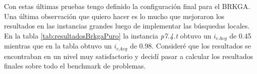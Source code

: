 \bigskip

Con estas últimas pruebas tengo definido la configuración final para el BRKGA. Una última observación que quiero hacer es lo mucho que mejoraron los resultados en las instancias grandes luego de implementar las búsquedas locales. En la tabla \ref{tab:resultadosBrkgaPuro} la instancia \textit{p7.4.t} obtuvo un $i_{eAvg}$ de 0.45 mientras que en la tabla \label{tab:resultadosLSDecos} obtuvo un $i_{eAvg}$ de 0.98. Consideré que los resultados se encontraban en un nivel muy satisfactorio y decidí pasar a calcular los resultados finales sobre todo el benchmark de problemas.



